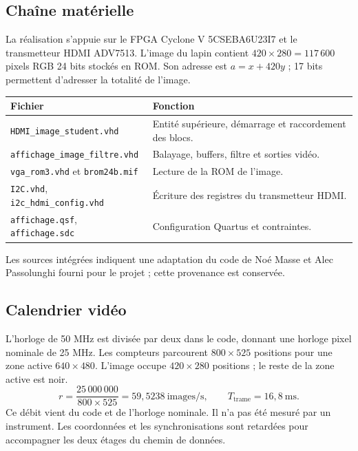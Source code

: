 \documentclass[11pt,a4paper]{article}
\begin{document}
\subsection{Chaîne matérielle}
La réalisation s'appuie sur le FPGA Cyclone V 5CSEBA6U23I7 et le transmetteur HDMI ADV7513. L'image du lapin contient $420\times280=117\,600$ pixels RGB 24 bits stockés en ROM. Son adresse est $a=x+420y$ ; 17 bits permettent d'adresser la totalité de l'image.

\begin{center}
\begin{tabularx}{\linewidth}{@{}l X@{}}
\toprule
Fichier & Fonction\\
\midrule
\texttt{HDMI\_image\_student.vhd} & Entité supérieure, démarrage et raccordement des blocs.\\
\texttt{affichage\_image\_filtre.vhd} & Balayage, buffers, filtre et sorties vidéo.\\
\texttt{vga\_rom3.vhd} et \texttt{brom24b.mif} & Lecture de la ROM de l'image.\\
\texttt{I2C.vhd}, \texttt{i2c\_hdmi\_config.vhd} & Écriture des registres du transmetteur HDMI.\\
\texttt{affichage.qsf}, \texttt{affichage.sdc} & Configuration Quartus et contraintes.\\
\bottomrule
\end{tabularx}
\end{center}
Les sources intégrées indiquent une adaptation du code de Noé Masse et Alec Passolunghi fourni pour le projet ; cette provenance est conservée.

\subsection{Calendrier vidéo}
L'horloge de 50 MHz est divisée par deux dans le code, donnant une horloge pixel nominale de 25 MHz. Les compteurs parcourent $800\times525$ positions pour une zone active $640\times480$. L'image occupe $420\times280$ positions ; le reste de la zone active est noir.
\[
 r=\frac{25\,000\,000}{800\times525}
   =59{,}5238\ \mathrm{images/s},\qquad
 T_{\mathrm{trame}}=16{,}8\ \mathrm{ms}.
\]
Ce débit vient du code et de l'horloge nominale. Il n'a pas été mesuré par un instrument. Les coordonnées et les synchronisations sont retardées pour accompagner les deux étages du chemin de données.
\end{document}
